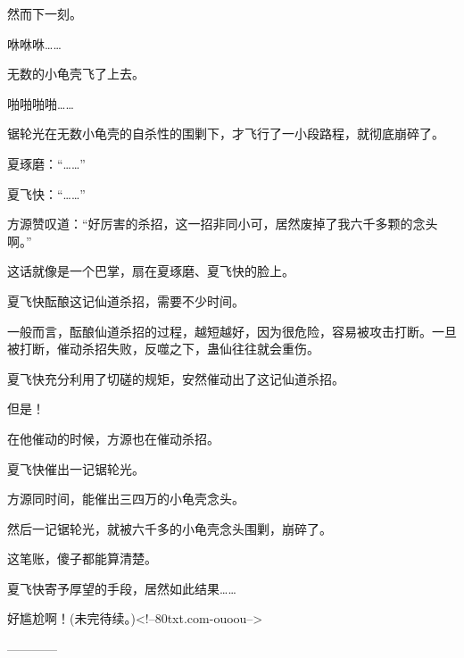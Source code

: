 \begin{this_body}
然而下一刻。

咻咻咻……

无数的小龟壳飞了上去。

啪啪啪啪……

锯轮光在无数小龟壳的自杀性的围剿下，才飞行了一小段路程，就彻底崩碎了。

夏琢磨：“……”

夏飞快：“……”

方源赞叹道：“好厉害的杀招，这一招非同小可，居然废掉了我六千多颗的念头啊。”

这话就像是一个巴掌，扇在夏琢磨、夏飞快的脸上。

夏飞快酝酿这记仙道杀招，需要不少时间。

一般而言，酝酿仙道杀招的过程，越短越好，因为很危险，容易被攻击打断。一旦被打断，催动杀招失败，反噬之下，蛊仙往往就会重伤。

夏飞快充分利用了切磋的规矩，安然催动出了这记仙道杀招。

但是！

在他催动的时候，方源也在催动杀招。

夏飞快催出一记锯轮光。

方源同时间，能催出三四万的小龟壳念头。

然后一记锯轮光，就被六千多的小龟壳念头围剿，崩碎了。

这笔账，傻子都能算清楚。

夏飞快寄予厚望的手段，居然如此结果……

好尴尬啊！(未完待续。)<!--80txt.com-ouoou-->

------------

\end{this_body}

